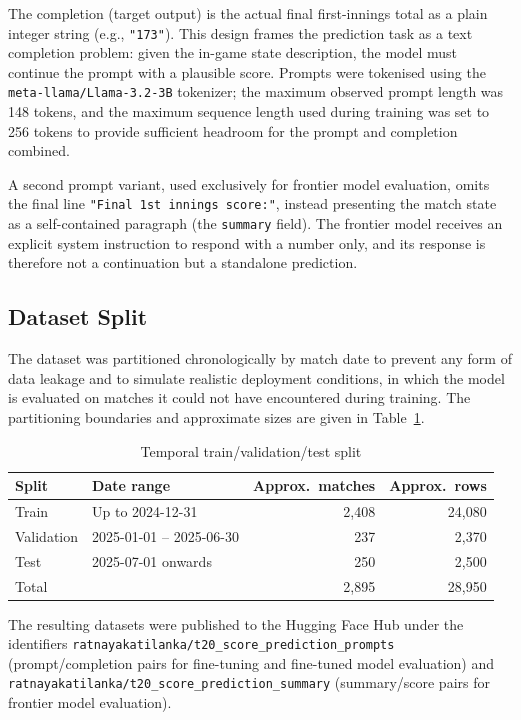 The completion (target output) is the actual final first-innings total as a plain integer string (e.g., \texttt{"173"}). This design frames the prediction task as a text completion problem: given the in-game state description, the model must continue the prompt with a plausible score. Prompts were tokenised using the \texttt{meta-llama/Llama-3.2-3B} tokenizer; the maximum observed prompt length was 148 tokens, and the maximum sequence length used during training was set to 256 tokens to provide sufficient headroom for the prompt and completion combined.

A second prompt variant, used exclusively for frontier model evaluation, omits the final line \texttt{"Final 1st innings score:"}, instead presenting the match state as a self-contained paragraph (the \texttt{summary} field). The frontier model receives an explicit system instruction to respond with a number only, and its response is therefore not a continuation but a standalone prediction.

\subsection{Dataset Split}

The dataset was partitioned chronologically by match date to prevent any form of data leakage and to simulate realistic deployment conditions, in which the model is evaluated on matches it could not have encountered during training. The partitioning boundaries and approximate sizes are given in Table~\ref{tab:split}.

\begin{table}[ht]
\centering
\caption{Temporal train/validation/test split}
\label{tab:split}
\begin{tabular}{llrr}
\hline
\textbf{Split} & \textbf{Date range} & \textbf{Approx.\ matches} & \textbf{Approx.\ rows} \\
\hline
Train      & Up to 2024-12-31          & 2,408 & 24,080 \\
Validation & 2025-01-01 -- 2025-06-30 & 237   & 2,370  \\
Test       & 2025-07-01 onwards        & 250   & 2,500  \\
\hline
Total      &                           & 2,895 & 28,950 \\
\hline
\end{tabular}
\end{table}

The resulting datasets were published to the Hugging Face Hub under the identifiers \texttt{ratnayakatilanka/t20\_score\_prediction\_prompts} (prompt/completion pairs for fine-tuning and fine-tuned model evaluation) and \texttt{ratna\-yaka\-tilanka/t20\_score\_pre\-diction\_summary} (summary/score pairs for frontier model evaluation).

